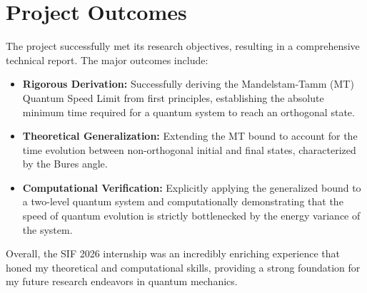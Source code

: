 \documentclass[11pt,a4paper]{article}
\begin{document}
\section*{Project Outcomes}
The project successfully met its research objectives, resulting in a comprehensive technical report. The major outcomes include:
\begin{itemize}[noitemsep,topsep=0pt]
    \item \textbf{Rigorous Derivation:} Successfully deriving the Mandelstam-Tamm (MT) Quantum Speed Limit from first principles, establishing the absolute minimum time required for a quantum system to reach an orthogonal state.
    \item \textbf{Theoretical Generalization:} Extending the MT bound to account for the time evolution between non-orthogonal initial and final states, characterized by the Bures angle.
    \item \textbf{Computational Verification:} Explicitly applying the generalized bound to a two-level quantum system and computationally demonstrating that the speed of quantum evolution is strictly bottlenecked by the energy variance of the system.
\end{itemize}

Overall, the SIF 2026 internship was an incredibly enriching experience that honed my theoretical and computational skills, providing a strong foundation for my future research endeavors in quantum mechanics.
\end{document}

